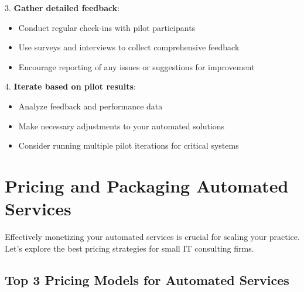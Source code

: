 3. \textbf{Gather detailed feedback}:
   \begin{itemize}
     \item Conduct regular check-ins with pilot participants
     \item Use surveys and interviews to collect comprehensive feedback
     \item Encourage reporting of any issues or suggestions for improvement
   \end{itemize}

4. \textbf{Iterate based on pilot results}:
   \begin{itemize}
     \item Analyze feedback and performance data
     \item Make necessary adjustments to your automated solutions
     \item Consider running multiple pilot iterations for critical systems
   \end{itemize}


\section{Pricing and Packaging Automated Services}\label{sec:pricing-and-packaging-automated-services}

Effectively monetizing your automated services is crucial for scaling your practice. Let's explore the best pricing strategies for small IT consulting firms.

\subsection{Top 3 Pricing Models for Automated Services}


